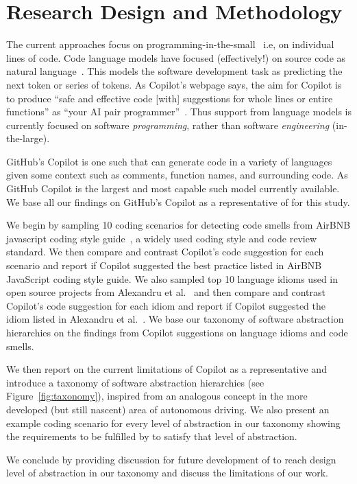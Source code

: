 \section{Research Design and Methodology}
The current \cct{} approaches focus on programming-in-the-small~\cite{DeRemer1976} i.e, on individual lines of code. 
Code language models have focused (effectively!) on source code as natural language~\cite{natural}.
This models the software development task as predicting the next token or series of tokens.
As Copilot's webpage says, the aim for Copilot is to produce ``safe and effective code [with] suggestions for whole lines or entire functions'' as ``your AI pair programmer''~\cite{Copilot-web}. 
Thus support from language models is currently focused on software \textit{programming}, rather than software \emph{engineering} (in-the-large).

GitHub's Copilot is one such \cct{} that can generate code in a variety of languages
given some context such as comments, function names, and surrounding code. As
GitHub Copilot is the largest and most capable such model currently available. We base all our findings on GitHub's Copilot as a representative of \cct{} for this study.

We begin by sampling 10 coding scenarios for detecting code smells from AirBNB javascript coding style guide~\cite{airbnb_code}, a widely used coding style and code review standard. We then compare and contrast Copilot's code suggestion for each scenario and report if Copilot suggested the best practice listed in AirBNB JavaScript coding style guide. 
We also sampled top 10 language idioms used in open source projects from Alexandru et al.~\cite{Alexandru2018} and then compare and contrast Copilot's code suggestion for each idiom and report if Copilot suggested the idiom listed in Alexandru et al.~\cite{Alexandru2018}. We base our taxonomy of software abstraction hierarchies on the findings from Copilot suggestions on language idioms and code smells.

We then report on the current limitations of Copilot as a representative \cct{} and introduce a taxonomy of software abstraction hierarchies (see Figure~\ref{fig:taxonomy}), inspired from an analogous concept in the more developed (but still nascent) area of autonomous driving. We also present an example coding scenario for every level of abstraction in our taxonomy showing the requirements to be fulfilled by \cct{} to satisfy that level of abstraction.

We conclude by providing discussion for future development of \cct{} to reach design level of abstraction in our taxonomy and discuss the limitations of our work. 

